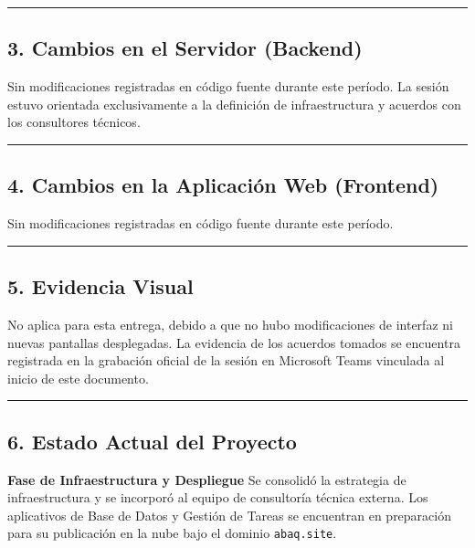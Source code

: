 \documentclass[
]{article}
\begin{document}
\begin{center}\rule{0.5\linewidth}{0.5pt}\end{center}

\subsection{3. Cambios en el Servidor
(Backend)}\label{cambios-en-el-servidor-backend}

Sin modificaciones registradas en código fuente durante este período. La
sesión estuvo orientada exclusivamente a la definición de
infraestructura y acuerdos con los consultores técnicos.

\begin{center}\rule{0.5\linewidth}{0.5pt}\end{center}

\subsection{4. Cambios en la Aplicación Web
(Frontend)}\label{cambios-en-la-aplicaciuxf3n-web-frontend}

Sin modificaciones registradas en código fuente durante este período.

\begin{center}\rule{0.5\linewidth}{0.5pt}\end{center}

\subsection{5. Evidencia Visual}\label{evidencia-visual}

No aplica para esta entrega, debido a que no hubo modificaciones de
interfaz ni nuevas pantallas desplegadas. La evidencia de los acuerdos
tomados se encuentra registrada en la grabación oficial de la sesión en
Microsoft Teams vinculada al inicio de este documento.

\begin{center}\rule{0.5\linewidth}{0.5pt}\end{center}

\subsection{6. Estado Actual del
Proyecto}\label{estado-actual-del-proyecto}

\textbf{Fase de Infraestructura y Despliegue} Se consolidó la estrategia
de infraestructura y se incorporó al equipo de consultoría técnica
externa. Los aplicativos de Base de Datos y Gestión de Tareas se
encuentran en preparación para su publicación en la nube bajo el dominio
\texttt{abaq.site}.
\end{document}
